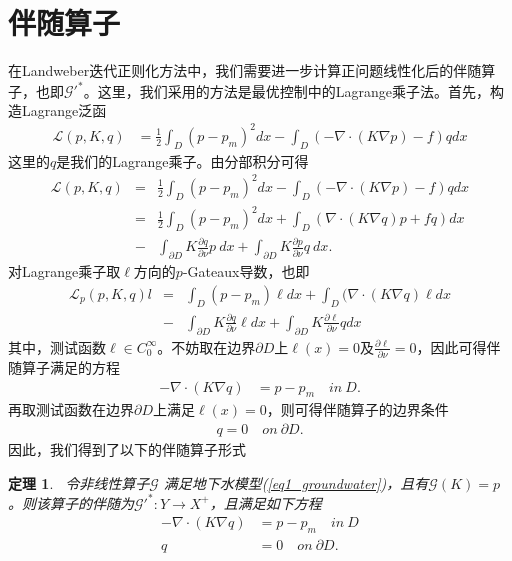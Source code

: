 \documentclass[a4paper,12pt,oneside,CJK]{cctbook}
\newtheorem{thm}  {\indent 定理}[section]
\theoremstyle{definition}
\numberwithin{equation}{section}
\begin{document}
\section{伴随算子}
在Landweber迭代正则化方法中，我们需要进一步计算正问题线性化后的伴随算子，也即$\mathcal{G'}^*$。这里，我们采用的方法是最优控制中的Lagrange乘子法。首先，构造Lagrange泛函
\begin{align*}
\mathcal{L}(p,K,q)&=\frac{1}{2}\int_D (p-p_m)^2 d x-\int_D(-\nabla\cdot (K\nabla p)-f)q d x
\end{align*}
这里的$q$是我们的Lagrange乘子。由分部积分可得
\begin{eqnarray*}
   \mathcal{L}(p,K,q)&=&\frac{1}{2}\int_D (p-p_m)^2 d x-\int_D(-\nabla\cdot (K\nabla p)-f)q d x\\
              &=&\frac{1}{2}\int_D (p-p_m)^2 d x+\int_D(\nabla\cdot (K\nabla q) p+f q) d x\\
&-&\int_{\partial D} K\frac{\partial q}{\partial \nu} p~dx +\int_{\partial D} K\frac{\partial p}{\partial \nu}q~dx.
\end{eqnarray*}
对Lagrange乘子取$\ell$方向的$p$-Gateaux导数，也即
\begin{eqnarray}\label{eq-DF*}
    \mathcal{L}_p(p,K,q)l&=&\int_D (p-p_m) \ell dx+\int_D(\nabla\cdot (K\nabla q)\ell d x\\
&-&\int_{\partial D} K\frac{\partial q}{\partial \nu}\ell dx +\int_{\partial D} K \frac{\partial \ell}{\partial \nu}qdx
\end{eqnarray}
其中，测试函数$\ell\in C_0^{\infty}$。不妨取在边界$\partial D$上$\ell(x)=0$及$\frac{\partial \ell}{\partial\nu}=0$，因此可得伴随算子满足的方程
\begin{align*}
   -\nabla\cdot(K\nabla q)&=p-p_m\quad in~D.
\end{align*}
再取测试函数在边界$\partial D$上满足$\ell(x)=0$，则可得伴随算子的边界条件
\begin{align*}
   q=0\quad on~ \partial D.
\end{align*}
因此，我们得到了以下的伴随算子形式

\begin{thm}\label{thm2_Fadjoint}~令非线性算子$\mathcal{G}$
满足地下水模型(\ref{eq1_groundwater})，且有$\mathcal{G}(K) = p$。则该算子的伴随为$\mathcal{G'}^* : Y \rightarrow X^+$，且满足如下方程
\begin{align}\label{eq2_Fadjoint}
   -\nabla\cdot(K\nabla q)&=p-p_m \quad in~ D\\
     q&=0\quad on~ \partial D.
\end{align}
\end{thm}
\end{document}
